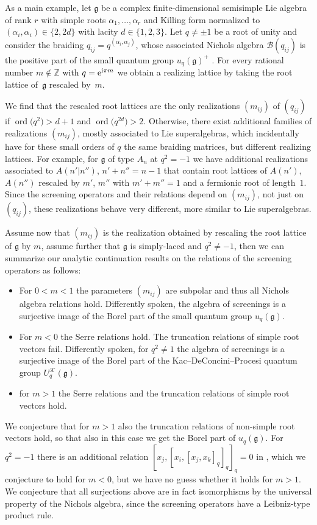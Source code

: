 \documentclass[10pt,a4paper]{amsart}
\numberwithin{equation}{section}
\newcommand{\Z}{\mathbb{Z}}
\newcommand{\g}{\mathfrak{g}}
\begin{document}
As a main example, let $\mathfrak{g}$ be a complex finite-dimensional semisimple Lie algebra of rank $r$ with simple roots $\alpha_1, \dots, \alpha_r$ and Killing form normalized to $(\alpha_i,\alpha_i)\in\{2,2d\}$ with lacity $d\in\{1,2,3\}$. Let $q\neq \pm1$ be a root of unity and consider the braiding $q_{ij} = q^{(\alpha_i, \alpha_j)}$, whose associated Nichols algebra $\mathcal{B}(q_{ij})$ is the positive part of the small quantum group $u_q(\mathfrak{g})^+$ \cite{AS10, Lusz93,Rosso98}. For every rational number $m\not\in \Z$ with $q= {\rm e}^{{\rm i} \pi m}$ we obtain a realizing lattice by taking the root lattice of~$\mathfrak{g}$ rescaled by~$m$.

We find that the rescaled root lattices are the only realizations $(m_{ij})$ of $(q_{ij})$ if $\operatorname{ord}\big(q^2\big)>d+1$ and $\operatorname{ord}\big(q^{2d}\big)>2$. Otherwise, there exist additional families of realizations $(m_{ij})$, mostly associated to Lie superalgebras, which incidentally have for these small orders of $q$ the same braiding matrices, but different realizing lattices. For example, for $\g$ of type $A_{n}$ at $q^2=-1$ we have additional realizations associated to $A(n'\vert n'')$, $n'+n''=n-1$ that contain root lattices of $A(n')$, $A(n'')$ rescaled by $m'$, $m''$ with $m'+m''=1$ and a fermionic root of length~$1$. Since the screening operators and their relations depend on $(m_{ij})$, not just on $(q_{ij})$, these realizations behave very different, more similar to Lie superalgebras.

Assume now that $(m_{ij})$ is the realization obtained by rescaling the root lattice of $\g$ by $m$, assume further that $\g$ is simply-laced and $q^2\neq -1$, then we can summarize our analytic continuation results on the relations of the screening operators as follows:
\begin{itemize}\itemsep=0pt
		\item For $0<m<1$ the parameters $(m_{ij})$ are subpolar and thus all Nichols algebra relations hold. Differently spoken, the algebra of screenings is a surjective image of the Borel part of the small quantum group $u_q(\g)$.
		\item For $m<0$ the Serre relations hold. The truncation relations of simple root vectors fail. Differently spoken, for $q^2\neq 1$ the algebra of screenings is a surjective image of the Borel part of the Kac--DeConcini--Procesi quantum group $U_q^\mathcal{K}(\g)$.
		\item for $m>1$ the Serre relations and the truncation relations of simple root vectors hold.
	\end{itemize}
We conjecture that for $m>1$ also the truncation relations of non-simple root vectors hold, so that also in this case we get the Borel part of $u_q(\g)$. 	
	For $q^2=-1$ there is an additional relation $[x_j,[x_i,[x_j,x_k]_q]_q]_q=0$ in \cite{AA17}, which we conjecture to hold for $m<0$, but we have no guess whether it holds for $m>1$.	We conjecture that all surjections above are in fact isomorphisms by the universal property of the Nichols algebra, since the screening operators have a Leibniz-type product rule.
	
\end{document}
